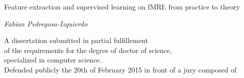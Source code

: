 \documentclass[nobib, a4paper, notoc, twoside, justified]{tufte-book}
\begin{document}
\begin{titlepage}
\begin{fullwidth}
\begin{center}
\vspace{10pt}



\vspace{2pc}
{ \Huge
{\color{msblue} {Feature extraction and supervised learning on fMRI: from practice to theory}} \\[0.5cm]
}




\vspace{3pc}
{\Huge \it Fabian Pedregosa-Izquierdo} \\

\vspace{3pc}



{\LARGE A dissertation submitted in partial fulfillement \\ \vspace{10pt} of the requirements for the degree of doctor of science, \\ \vspace{10pt} specialized in computer science.} \\
\vspace{2pc}
{\LARGE Defended publicly the 20th of February 2015 in front of a jury composed of}
\vspace{2pc}



\end{center}
\end{fullwidth}
\end{titlepage}
\end{document}

